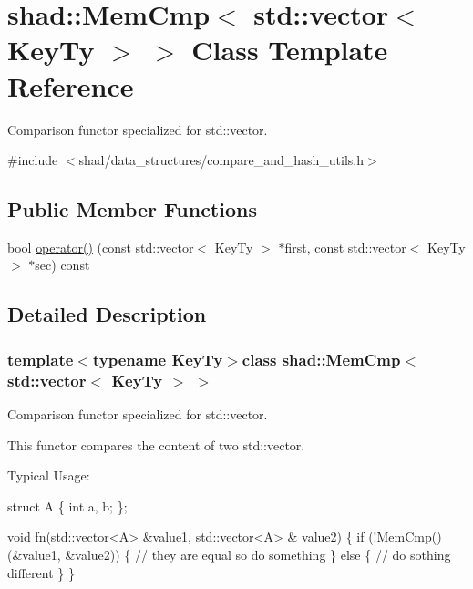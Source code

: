 \hypertarget{classshad_1_1MemCmp_3_01std_1_1vector_3_01KeyTy_01_4_01_4}{\section{shad\-:\-:Mem\-Cmp$<$ std\-:\-:vector$<$ Key\-Ty $>$ $>$ Class Template Reference}
\label{classshad_1_1MemCmp_3_01std_1_1vector_3_01KeyTy_01_4_01_4}
}


Comparison functor specialized for std\-::vector.  




{\ttfamily \#include $<$shad/data\-\_\-structures/compare\-\_\-and\-\_\-hash\-\_\-utils.\-h$>$}

\subsection*{Public Member Functions}
\begin{DoxyCompactItemize}
\item 
bool \hyperlink{classshad_1_1MemCmp_3_01std_1_1vector_3_01KeyTy_01_4_01_4_aeacb3178b19255d7c248f46bda51a7bd}{operator()} (const std\-::vector$<$ Key\-Ty $>$ $\ast$first, const std\-::vector$<$ Key\-Ty $>$ $\ast$sec) const 
\end{DoxyCompactItemize}


\subsection{Detailed Description}
\subsubsection*{template$<$typename Key\-Ty$>$class shad\-::\-Mem\-Cmp$<$ std\-::vector$<$ Key\-Ty $>$ $>$}

Comparison functor specialized for std\-::vector. 

This functor compares the content of two std\-::vector.

Typical Usage\-: 
\begin{DoxyCode}
\textcolor{keyword}{struct }A \{
  \textcolor{keywordtype}{int} a, b;
\};

\textcolor{keywordtype}{void} fn(std::vector<A> &value1, std::vector<A> & value2) \{
  \textcolor{keywordflow}{if} (!MemCmp()(&value1, &value2)) \{
    \textcolor{comment}{// they are equal so do something}
  \} \textcolor{keywordflow}{else} \{
    \textcolor{comment}{// do sothing different}
  \}
\}
\end{DoxyCode}



